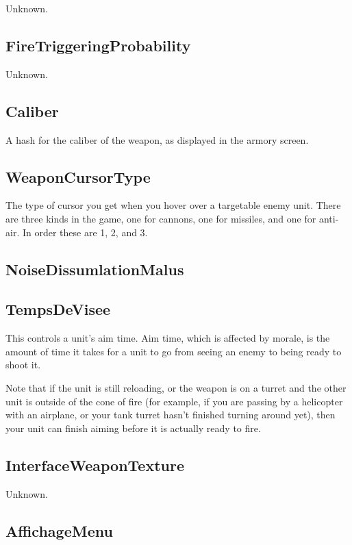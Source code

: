 \documentclass{article}
\begin{document}
Unknown.

\subsection{FireTriggeringProbability}

Unknown.

\subsection{Caliber}

A hash for the caliber of the weapon, as displayed in the armory screen.

\subsection{WeaponCursorType}

The type of cursor you get when you hover over a targetable enemy unit. There are three kinds in the game, one for cannons, one for missiles, and one for anti-air. In order these are 1, 2, and 3.

\subsection{NoiseDissumlationMalus}
\subsection{TempsDeVisee}

This controls a unit's aim time. Aim time, which is affected by morale, is the amount of time it takes for a unit to go from seeing an enemy to being ready to shoot it.

Note that if the unit is still reloading, or the weapon is on a turret and the other unit is outside of the cone of fire (for example, if you are passing by a helicopter with an airplane, or your tank turret hasn't finished turning around yet), then your unit can finish aiming before it is actually ready to fire.

\subsection{InterfaceWeaponTexture}

Unknown.

\subsection{AffichageMenu}
\end{document}
